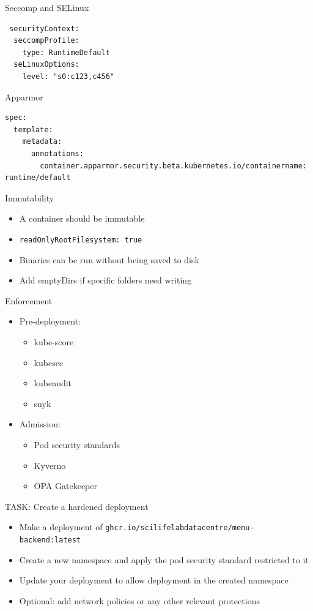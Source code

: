 \documentclass{dcpresentation}
\begin{document}
\begin{frame}[fragile]{Seccomp and SELinux}
\begin{verbatim}
 securityContext:
  seccompProfile:
    type: RuntimeDefault
  seLinuxOptions:
    level: "s0:c123,c456"
\end{verbatim}
\end{frame}

\begin{frame}[fragile]{Apparmor}
\begin{verbatim}
spec:
  template:
    metadata:
      annotations:
        container.apparmor.security.beta.kubernetes.io/containername: runtime/default
\end{verbatim}
\end{frame}



\begin{frame}{Immutability}
  \begin{itemize}
    \item A container should be immutable
    \item \texttt{readOnlyRootFilesystem: true}
    \item Binaries can be run without being saved to disk
    \item Add emptyDirs if specific folders need writing 
  \end{itemize}
\end{frame}


\begin{frame}{Enforcement}
\begin{itemize}
 \item Pre-deployment:
 \begin{itemize}
  \item kube-score
  \item kubesec
  \item kubeaudit
  \item snyk
 \end{itemize}
 \item Admission:
 \begin{itemize}
  \item Pod security standards
  \item Kyverno
  \item OPA Gatekeeper
 \end{itemize}
\end{itemize}
\end{frame}

\begin{frame}{TASK: Create a hardened deployment}
  \begin{itemize}
  \item Make a deployment of \texttt{ghcr.io/scilifelabdatacentre/menu-backend:latest}
  \item Create a new namespace and apply the pod security standard restricted to it
  \item Update your deployment to allow deployment in the created namespace
  \item Optional: add network policies or any other relevant protections
  \end{itemize}
\end{frame}
\end{document}
